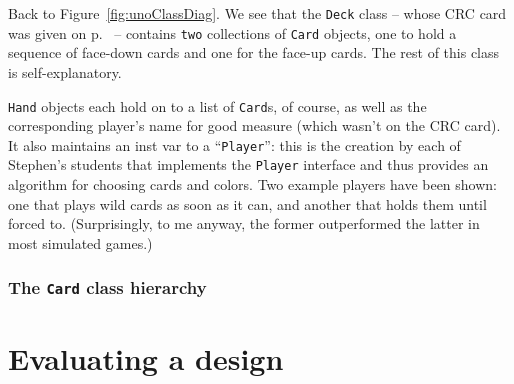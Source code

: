 Back to Figure~\ref{fig:unoClassDiag}. We see that the \texttt{Deck} class --
whose CRC card was given on p.~\pageref{unoCRC2} -- contains \texttt{two}
collections of \texttt{Card} objects, one to hold a sequence of face-down cards
and one for the face-up cards. The rest of this class is self-explanatory.

\texttt{Hand} objects each hold on to a list of \texttt{Card}s, of course, as
well as the corresponding player's name for good measure (which wasn't on the
CRC card). It also maintains an inst var to a ``\texttt{Player}'': this is the
creation by each of Stephen's students that implements the \texttt{Player}
interface and thus provides an algorithm for choosing cards and colors. Two
example players have been shown: one that plays wild cards as soon as it can,
and another that holds them until forced to. (Surprisingly, to me anyway, the
former outperformed the latter in most simulated games.)

\subsubsection{The \texttt{Card} class hierarchy}

\section{Evaluating a design}

